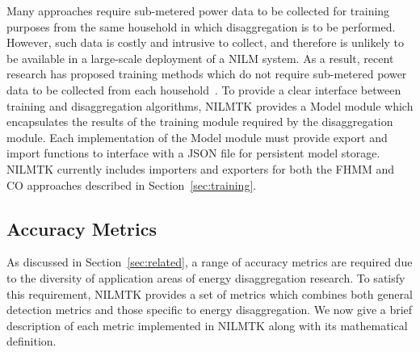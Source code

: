 \documentclass{sig-alternate}
\newcommand{\bluecolor}[1]{\textcolor{blue}{#1}}
\newcommand{\secref}[1]{Section~\ref{#1}}
\begin{document}
\noindent
Many approaches require sub-metered power data to be collected for training purposes from the same household in which disaggregation is to be performed. However, such data is costly and intrusive to collect, and therefore is unlikely to be available in a large-scale deployment of a NILM system. As a result, recent research has proposed training methods which do not require sub-metered power data to be collected from each household~\cite{kim_2011,parson_2012}. To provide a clear interface between training and disaggregation algorithms, NILMTK provides a Model module which encapsulates the results of the training module required by the disaggregation module. Each implementation of the Model module must provide export and import functions to interface with a JSON file for persistent model storage. NILMTK currently includes importers and exporters for both the FHMM and CO approaches described in \secref{sec:training}.


\subsection{Accuracy Metrics}
\label{sec:metrics}

\noindent
As discussed in \secref{sec:related}, a range of accuracy metrics are required due to the diversity of application areas of energy disaggregation research. To satisfy this requirement, NILMTK provides a set of metrics which combines both general detection metrics and those specific to energy disaggregation. We now give a brief description of each metric implemented in NILMTK along with its mathematical definition.
\end{document}
